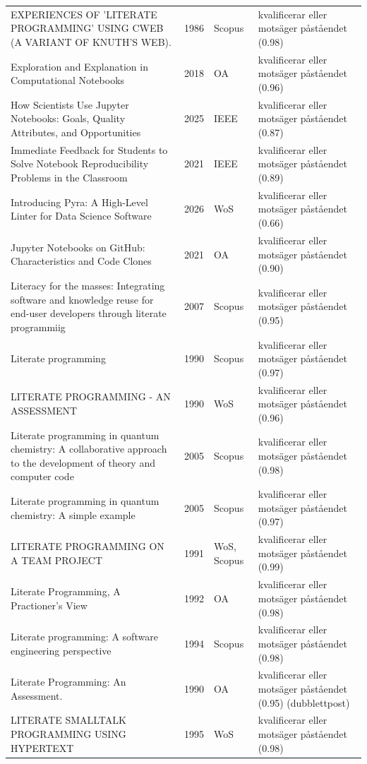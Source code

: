 \begin{longtable}{@{}%
  >{\raggedright\arraybackslash}p{}c%
  >{\raggedright\arraybackslash}p{}%
  >{\raggedright\arraybackslash}p{}@{}}
EXPERIENCES OF 'LITERATE PROGRAMMING' USING CWEB (A VARIANT OF KNUTH'S WEB). & 1986 & Scopus & kvalificerar eller motsäger påståendet (0.98) \\
Exploration and Explanation in Computational Notebooks & 2018 & OA & kvalificerar eller motsäger påståendet (0.96) \\
How Scientists Use Jupyter Notebooks: Goals, Quality Attributes, and Opportunities & 2025 & IEEE & kvalificerar eller motsäger påståendet (0.87) \\
Immediate Feedback for Students to Solve Notebook Reproducibility Problems in the Classroom & 2021 & IEEE & kvalificerar eller motsäger påståendet (0.89) \\
Introducing Pyra: A High-Level Linter for Data Science Software & 2026 & WoS & kvalificerar eller motsäger påståendet (0.66) \\
Jupyter Notebooks on GitHub: Characteristics and Code Clones & 2021 & OA & kvalificerar eller motsäger påståendet (0.90) \\
Literacy for the masses: Integrating software and knowledge reuse for end-user developers through literate programmiig & 2007 & Scopus & kvalificerar eller motsäger påståendet (0.95) \\
Literate programming & 1990 & Scopus & kvalificerar eller motsäger påståendet (0.97) \\
LITERATE PROGRAMMING - AN ASSESSMENT & 1990 & WoS & kvalificerar eller motsäger påståendet (0.96) \\
Literate programming in quantum chemistry: A collaborative approach to the development of theory and computer code & 2005 & Scopus & kvalificerar eller motsäger påståendet (0.98) \\
Literate programming in quantum chemistry: A simple example & 2005 & Scopus & kvalificerar eller motsäger påståendet (0.97) \\
LITERATE PROGRAMMING ON A TEAM PROJECT & 1991 & WoS, Scopus & kvalificerar eller motsäger påståendet (0.99) \\
Literate Programming, A Practioner's View & 1992 & OA & kvalificerar eller motsäger påståendet (0.98) \\
Literate programming: A software engineering perspective & 1994 & Scopus & kvalificerar eller motsäger påståendet (0.98) \\
Literate Programming: An Assessment. & 1990 & OA & kvalificerar eller motsäger påståendet (0.95) (dubblettpost) \\
LITERATE SMALLTALK PROGRAMMING USING HYPERTEXT & 1995 & WoS & kvalificerar eller motsäger påståendet (0.98) \\

\end{longtable}
